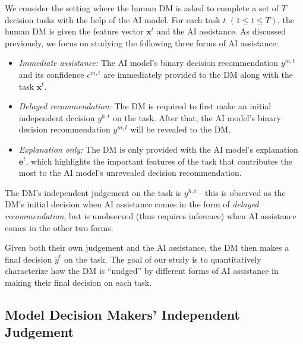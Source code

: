 \documentclass[letterpaper]{article} %
\newcommand{\my}[1]{\textcolor{blue}{[Ming: #1]}}
\newcommand{\zy}[1]{\textcolor{red}{[Zhuoyan: #1]}}
\begin{document}
We consider the setting where the human DM is asked to complete a set of $T$ decision tasks with the help of the AI model. For each task $t$ $(1\leq t \leq T)$, the human DM is given the feature vector $\bm{x}^t$ and the AI assistance. As discussed previously, we focus on studying the following three forms of AI assistance: 
\begin{itemize}
\label{ai_treament}
    \item \emph{Immediate assistance:} The AI model's binary decision recommendation $y^{m,t}$ and its confidence $c^{m,t}$ are immediately provided to the DM along with the task $\bm{x}^t$.

    \item \emph{Delayed recommendation:} The DM is required to first make an initial independent decision $y^{h,t}$ on the task. After that,  
    the AI model's binary decision recommendation $y^{m,t}$ will be revealed to the DM.
      
    \item \emph{Explanation only:} The DM is only provided with the AI model's explanation $\bm{e}^t$, which highlights the important features of the task that contributes the most to the AI model's unrevealed decision recommendation.


\end{itemize}
The DM's independent judgement on the task is $y^{h,t}$---this is observed as the DM's initial decision when AI assistance comes in the form of 
\emph{delayed recommendation}, but is unobserved (thus requires inference) when AI assistance comes in the other two forms. 
  
Given both their own judgement and the AI assistance, the DM then makes a final decision $\hat{y}^t$ on the task. The goal of our study is to quantitatively characterize 
how the DM is ``nudged'' by different forms of AI assistance in making their final decision on each task.

\subsection{Model Decision Makers' Independent Judgement}
 
\end{document}
